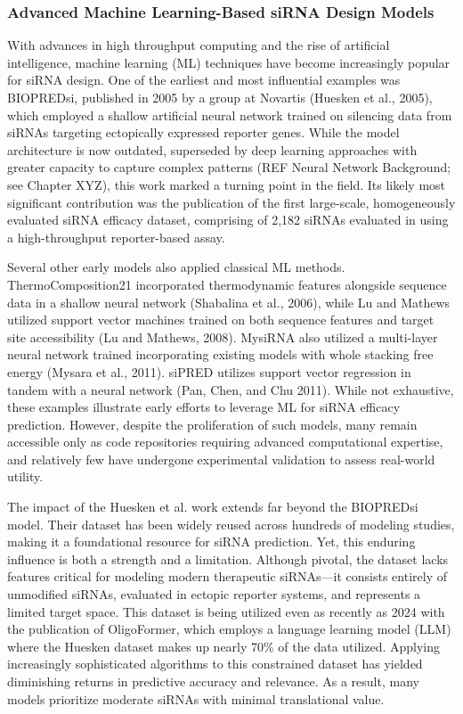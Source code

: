 \documentclass{report}
\begin{document}
\subsubsection{Advanced Machine Learning-Based siRNA Design Models}

With advances in high throughput computing and the rise of artificial intelligence, machine learning (ML) techniques have become increasingly popular for siRNA design. One of the earliest and most influential examples was BIOPREDsi, published in 2005 by a group at Novartis (Huesken et al., 2005), which employed a shallow artificial neural network trained on silencing data from siRNAs targeting ectopically expressed reporter genes. While the model architecture is now outdated, superseded by deep learning approaches with greater capacity to capture complex patterns (REF Neural Network Background; see Chapter XYZ), this work marked a turning point in the field. Its likely most significant contribution was the publication of the first large-scale, homogeneously evaluated siRNA efficacy dataset, comprising of 2,182 siRNAs evaluated in using a high-throughput reporter-based assay.

Several other early models also applied classical ML methods. ThermoComposition21 incorporated thermodynamic features alongside sequence data in a shallow neural network (Shabalina et al., 2006), while Lu and Mathews utilized support vector machines trained on both sequence features and target site accessibility (Lu and Mathews, 2008). MysiRNA also utilized a multi-layer neural network trained incorporating existing models with whole stacking free energy (Mysara et al., 2011). siPRED utilizes support vector regression in tandem with a neural network (Pan, Chen, and Chu 2011). While not exhaustive, these examples illustrate early efforts to leverage ML for siRNA efficacy prediction. However, despite the proliferation of such models, many remain accessible only as code repositories requiring advanced computational expertise, and relatively few have undergone experimental validation to assess real-world utility.

The impact of the Huesken et al. work extends far beyond the BIOPREDsi model. Their dataset has been widely reused across hundreds of modeling studies, making it a foundational resource for siRNA prediction. Yet, this enduring influence is both a strength and a limitation. Although pivotal, the dataset lacks features critical for modeling modern therapeutic siRNAs—it consists entirely of unmodified siRNAs, evaluated in ectopic reporter systems, and represents a limited target space. This dataset is being utilized even as recently as 2024 with the publication of OligoFormer, which employs a language learning model (LLM) where the Huesken dataset makes up nearly 70\% of the data utilized. Applying increasingly sophisticated algorithms to this constrained dataset has yielded diminishing returns in predictive accuracy and relevance. As a result, many models prioritize moderate siRNAs with minimal translational value.
\end{document}
